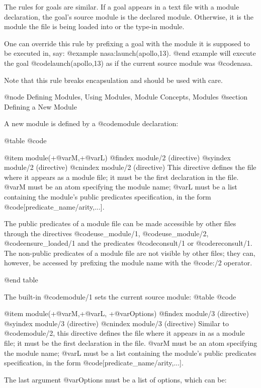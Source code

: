 {{{{The rules for goals are similar. If a goal appears in a text file with a
module declaration, the goal's source module is the declared
module. Otherwise, it is the module the file is being loaded into or the
type-in module.

One can override this rule by prefixing a goal with the module it is
supposed to be executed in, say:
@example
nasa:launch(apollo,13).
@end example
will execute the goal @code{launch(apollo,13)} as if the current source
module was @code{nasa}.

Note that this rule breaks encapsulation and should be used with care.

@node Defining Modules, Using Modules, Module Concepts, Modules
@section Defining a New Module

A new module is defined by a @code{module} declaration:

@table @code

@item module(+@var{M},+@var{L})
@findex module/2 (directive)
@syindex module/2 (directive)
@cnindex module/2 (directive)
This directive defines the file where it appears as a module file; it
must be the first declaration in the file.
@var{M} must be an atom specifying the module name; @var{L} must be a list
containing the module's public predicates specification, in the form
@code{[predicate_name/arity,...]}.

The public predicates of a module file can be made accessible by other
files through the directives @code{use_module/1}, @code{use_module/2},
@code{ensure_loaded/1} and the predicates @code{consult/1} or
@code{reconsult/1}. The non-public predicates
of a module file are not visible by other files; they can, however, be
accessed by prefixing the module name with the
@code{:/2} operator.

@end table

The built-in @code{module/1} sets the current source module:
@table @code

@item module(+@var{M},+@var{L}, +@var{Options})
@findex module/3 (directive)
@syindex module/3 (directive)
@cnindex module/3 (directive)
Similar to @code{module/2}, this directive defines the file where it
appears in as a module file; it must be the first declaration in the file.
@var{M} must be an atom specifying the module name; @var{L} must be a
list containing the module's public predicates specification, in the
form @code{[predicate_name/arity,...]}.

The last argument @var{Options} must be a list of options, which can be:

}}}}
